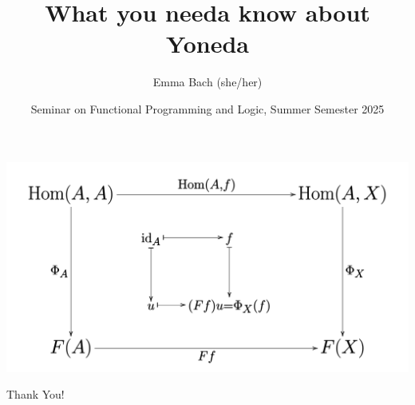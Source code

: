 \documentclass[aspectratio=169]{beamer} %
\title{What you needa know about Yoneda}
\author{Emma Bach (she/her)}
\date{Seminar on Functional Programming and Logic, Summer Semester 2025}
\begin{document}

\begin{frame}[plain]
    \includegraphics[width=0.4\paperwidth]{figures/Yoneda_lemma_cd.svg.png}
    \titlepage
\end{frame}






\begin{frame}
	\centering	\Large{Thank You!}
\end{frame}
\end{document}
